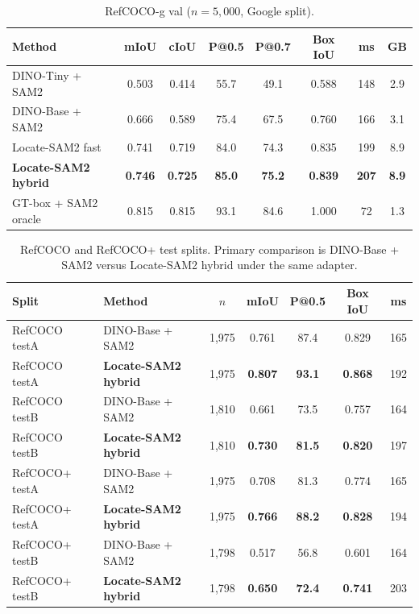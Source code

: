 \begin{table}[t]
  \centering
  \caption{RefCOCO-g val ($n{=}5{,}000$, Google split).}
  \label{tab:refcocog}
  \footnotesize
  \setlength{\tabcolsep}{4.8pt}
  \begin{tabular*}{\textwidth}{@{\extracolsep{\fill}}lccccccc@{}}
    \toprule
    Method & mIoU & cIoU & P@0.5 & P@0.7 & Box IoU & ms & GB \\
    \midrule
    DINO-Tiny + SAM2    & 0.503 & 0.414 & 55.7 & 49.1 & 0.588 & 148 & 2.9 \\
    DINO-Base + SAM2    & 0.666 & 0.589 & 75.4 & 67.5 & 0.760 & 166 & 3.1 \\
    Locate-SAM2 fast    & 0.741 & 0.719 & 84.0 & 74.3 & 0.835 & 199 & 8.9 \\
    \textbf{Locate-SAM2 hybrid} & \textbf{0.746} & \textbf{0.725} & \textbf{85.0} & \textbf{75.2} & \textbf{0.839} & \textbf{207} & \textbf{8.9} \\
    GT-box + SAM2 oracle & 0.815 & 0.815 & 93.1 & 84.6 & 1.000 & 72  & 1.3 \\
    \bottomrule
  \end{tabular*}
\end{table}

\begin{table}[t]
  \centering
  \caption{RefCOCO and RefCOCO+ test splits. Primary comparison is DINO-Base + SAM2 versus Locate-SAM2 hybrid under the same adapter.}
  \label{tab:test-splits}
  \footnotesize
  \setlength{\tabcolsep}{4.8pt}
  \begin{tabular*}{\textwidth}{@{\extracolsep{\fill}}llccccc@{}}
    \toprule
    Split & Method & $n$ & mIoU & P@0.5 & Box IoU & ms \\
    \midrule
    RefCOCO testA  & DINO-Base + SAM2 & 1,975 & 0.761 & 87.4 & 0.829 & 165 \\
    RefCOCO testA  & \textbf{Locate-SAM2 hybrid} & 1,975 & \textbf{0.807} & \textbf{93.1} & \textbf{0.868} & 192 \\
    RefCOCO testB  & DINO-Base + SAM2 & 1,810 & 0.661 & 73.5 & 0.757 & 164 \\
    RefCOCO testB  & \textbf{Locate-SAM2 hybrid} & 1,810 & \textbf{0.730} & \textbf{81.5} & \textbf{0.820} & 197 \\
    RefCOCO+ testA & DINO-Base + SAM2 & 1,975 & 0.708 & 81.3 & 0.774 & 165 \\
    RefCOCO+ testA & \textbf{Locate-SAM2 hybrid} & 1,975 & \textbf{0.766} & \textbf{88.2} & \textbf{0.828} & 194 \\
    RefCOCO+ testB & DINO-Base + SAM2 & 1,798 & 0.517 & 56.8 & 0.601 & 164 \\
    RefCOCO+ testB & \textbf{Locate-SAM2 hybrid} & 1,798 & \textbf{0.650} & \textbf{72.4} & \textbf{0.741} & 203 \\
    \bottomrule
  \end{tabular*}
\end{table}
